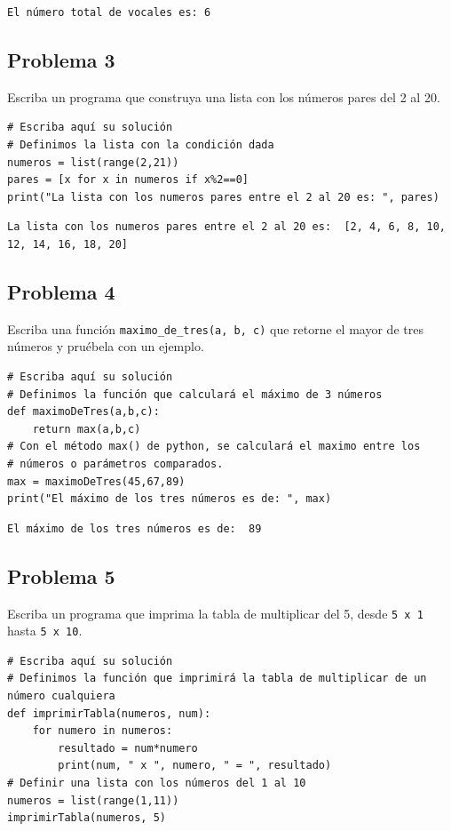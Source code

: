 \documentclass{article}
\begin{document}
\begin{verbatim}
El número total de vocales es: 6
\end{verbatim}

\subsection{Problema 3}
\label{sec:orga849da2}
Escriba un programa que construya una lista con los números pares del 2 al 20.

\begin{verbatim}
# Escriba aquí su solución
# Definimos la lista con la condición dada
numeros = list(range(2,21))
pares = [x for x in numeros if x%2==0]
print("La lista con los numeros pares entre el 2 al 20 es: ", pares)
\end{verbatim}

\begin{verbatim}
La lista con los numeros pares entre el 2 al 20 es:  [2, 4, 6, 8, 10, 12, 14, 16, 18, 20]
\end{verbatim}

\subsection{Problema 4}
\label{sec:orga76ac20}
Escriba una función \texttt{maximo\_de\_tres(a, b, c)} que retorne el mayor de tres números y pruébela con un ejemplo.

\begin{verbatim}
# Escriba aquí su solución
# Definimos la función que calculará el máximo de 3 números
def maximoDeTres(a,b,c):
    return max(a,b,c)
# Con el método max() de python, se calculará el maximo entre los
# números o parámetros comparados.
max = maximoDeTres(45,67,89)
print("El máximo de los tres números es de: ", max)
\end{verbatim}

\begin{verbatim}
El máximo de los tres números es de:  89
\end{verbatim}

\subsection{Problema 5}
\label{sec:org0fc8d19}
Escriba un programa que imprima la tabla de multiplicar del 5, desde \texttt{5 x 1} hasta \texttt{5 x 10}.

\begin{verbatim}
# Escriba aquí su solución
# Definimos la función que imprimirá la tabla de multiplicar de un número cualquiera
def imprimirTabla(numeros, num):
    for numero in numeros:
        resultado = num*numero
        print(num, " x ", numero, " = ", resultado)
# Definir una lista con los números del 1 al 10
numeros = list(range(1,11))
imprimirTabla(numeros, 5)
\end{verbatim}
\end{document}
